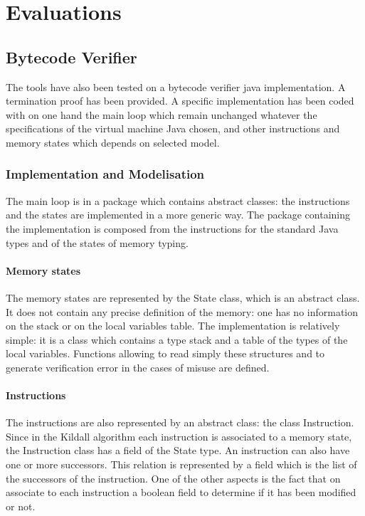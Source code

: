 \section{Evaluations}






\subsection{Bytecode Verifier}
The tools have also been tested on a bytecode verifier java implementation. A termination proof has been provided.
A specific implementation has been coded with on one hand the main loop which remain unchanged whatever the specifications of the virtual machine Java chosen, and other instructions and memory states which depends on selected model.
\subsubsection{Implementation and Modelisation}
The main loop is in a package which contains abstract classes: 
the instructions and the states are implemented in a more generic way.
The package containing the implementation is composed from the instructions for the standard Java types and of the states of memory typing. 
\paragraph {Memory states}
The memory states are represented by the State class, which is an abstract class.  It does not contain any precise definition of the memory: 
one has no information on the stack or on the local variables table. 
The implementation is relatively simple: 
it is a class which contains a type stack and a table of the types of the local variables. 
Functions allowing to read simply these structures and to generate verification error in the cases of misuse are defined.   
\paragraph{Instructions}
The instructions are also represented by an abstract class: 
the class Instruction.  
Since in the Kildall algorithm each instruction is associated to a memory state,  the Instruction class has a field of the State type. 
An instruction can also have one or more successors. 
This relation is represented by a field which is the list of the successors of the instruction.  
One of the other aspects is the fact that on associate to each instruction a boolean field to determine if it has been modified or not.

